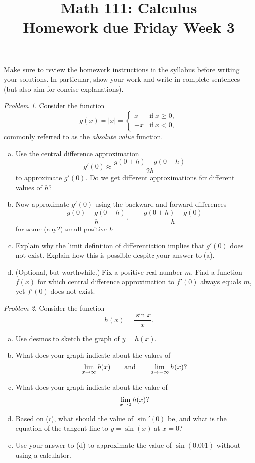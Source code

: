 \documentclass[11pt,twoside]{amsart}
\title{Math 111: Calculus\\ Homework due Friday Week 3}
\theoremstyle{plain}
\theoremstyle{remark}
\newtheorem{prob}{Problem}
\theoremstyle{definition}
\theoremstyle{definition}
\begin{document}
\maketitle

\noindent Make sure to review the homework instructions in the syllabus before writing your solutions. In particular, show your work and write in complete sentences (but also aim for concise explanations).

\begin{prob}
Consider the function
\[
  g(x) = |x| =
  \begin{cases}
    x&\text{if }x\ge 0,\\
    -x&\text{if }x<0,
  \end{cases}
\]
commonly referred to as the \emph{absolute value} function.
\begin{enumerate}[(a)]
\item Use the central difference approximation 
\[
  g'(0)\approx \frac{g(0+h)-g(0-h)}{2h}
\]
to approximate $g'(0)$. Do we get different approximations for different values of $h$?
\item Now approximate $g'(0)$ using the backward and forward differences
\[
  \frac{g(0)-g(0-h)}{h},\qquad \frac{g(0+h)-g(0)}{h}
\]
for some (any?) small positive $h$.
\item Explain why the limit definition of differentiation implies that $g'(0)$ does not exist. Explain how this is possible despite your answer to (a).
\item (Optional, but worthwhile.) Fix a positive real number $m$. Find a function $f(x)$ for which central difference approximation to $f'(0)$ always equals $m$, yet $f'(0)$ does not exist.
\end{enumerate}
\end{prob}

\begin{prob}
Consider the function
\[
  h(x) = \frac{\sin x}{x}.
\]
\begin{enumerate}[(a)]
\item Use \href{https://www.desmos.com/calculator}{desmos} to sketch the graph of $y=h(x)$.
\item What does your graph indicate about the values of
\[
  \lim_{x\to \infty}h(x)\qquad\text{and}\qquad\lim_{x\to -\infty}h(x)\text?
\]
\item What does your graph indicate about the value of
\[
  \lim_{x\to 0}h(x)\text?
\]
\item Based on (c), what should the value of $\sin'(0)$ be, and what is the equation of the tangent line to $y=\sin(x)$ at $x=0$?
\item Use your answer to (d) to approximate the value of $\sin(0.001)$ without using a calculator.
\end{enumerate}
\end{prob}
\end{document}

